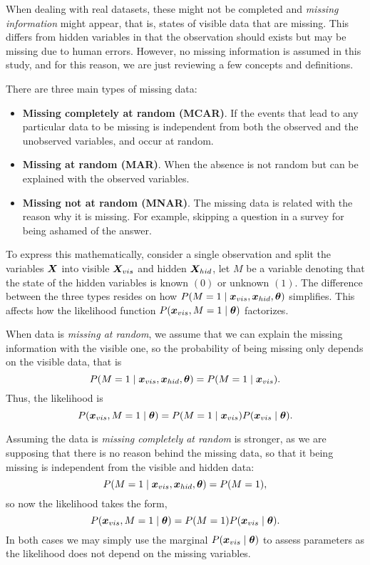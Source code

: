 
When dealing with real datasets, these might not be completed and \emph{missing information} might appear, that is, states of visible data that are missing. This differs from hidden variables in that the observation should exists but may be missing due to human errors. However, no missing information is assumed in this study, and for this reason, we are just reviewing a few concepts and definitions.

There are three main types of missing data:
\begin{itemize}
  \item \textbf{Missing completely at random (MCAR)}. If the events that lead to any particular data to be missing is independent from both the observed and the unobserved variables, and occur at random.
  \item \textbf{Missing at random (MAR)}. When the absence is not random but can be explained with the observed variables.
  \item \textbf{Missing not at random (MNAR)}. The missing data is related with the reason why it is missing. For example, skipping a question in a survey for being ashamed of the answer.
\end{itemize}

To express this mathematically, consider a single observation and split the variables \(\bm{X}\) into visible \(\bm{X}_{vis}\) and hidden \(\bm{X}_{hid}\), let \(M\) be a variable denoting that the state of the hidden variables is known \((0)\) or unknown \((1)\). The difference between the three types resides on how \(P(M = 1 \mid \bm{x}_{vis}, \bm{x}_{hid}, \bm{\theta})\) simplifies. This affects how the likelihood function \(P(\bm{x}_{vis}, M=1 \mid \bm{\theta})\) factorizes.

When data is \emph{missing at random}, we assume that we can explain the missing information with the visible one, so the probability of being missing only depends on the visible data, that is
\[
  P(M = 1 \mid \bm{x}_{vis}, \bm{x}_{hid}, \bm{\theta}) = P(M = 1 \mid \bm{x}_{vis}).
\]
Thus, the likelihood is
\[
  P(\bm{x}_{vis}, M = 1 \mid \bm{\theta}) = P(M = 1 \mid \bm{x}_{vis})P(\bm{x}_{vis} \mid \bm{\theta}).
\]

Assuming the data is \emph{missing completely at random} is stronger, as we are supposing that there is no reason behind the missing data, so that it being missing is independent from the visible and hidden data:
\[
  P(M = 1 \mid \bm{x}_{vis}, \bm{x}_{hid}, \bm{\theta}) = P(M = 1),
\]
so now the likelihood takes the form,
\[
    P(\bm{x}_{vis}, M = 1 \mid \bm{\theta}) = P(M = 1)P(\bm{x}_{vis} \mid \bm{\theta}).
\]
In both cases we may simply use the marginal \(P(\bm{x}_{vis} \mid \bm{\theta})\) to assess parameters as the likelihood does not depend on the missing variables.


